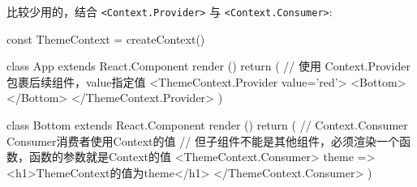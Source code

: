 比较少用的，结合 \texttt{<Context.Provider>} 与 \texttt{<Context.Consumer>}:

\begin{JavaScript}
const ThemeContext = createContext()

class App extends React.Component {
  render () {
    return (
      // 使用 Context.Provider 包裹后续组件，value指定值 
      <ThemeContext.Provider value={'red'}>
        <Bottom></Bottom>
      </ThemeContext.Provider>
    )
  }
}

class Bottom extends React.Component {
  render () {
    return (
      // Context.Consumer Consumer消费者使用Context的值
      // 但子组件不能是其他组件，必须渲染一个函数，函数的参数就是Context的值
      <ThemeContext.Consumer>
        {
          theme => <h1>ThemeContext的值为{theme}</h1>
        }
      </ThemeContext.Consumer>
    )
  }
}
\end{JavaScript}

\newpage